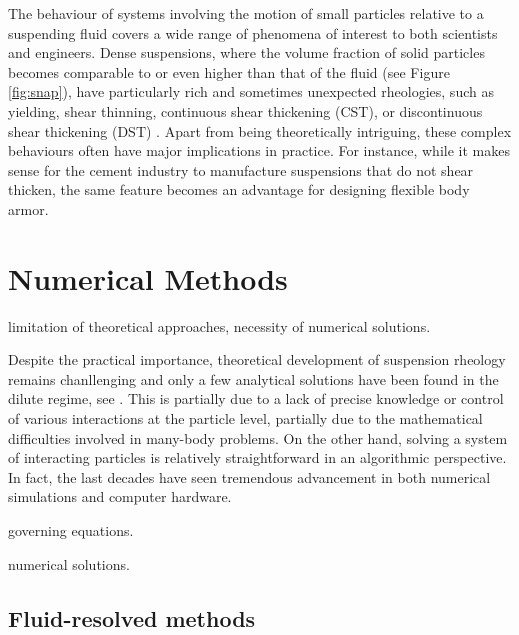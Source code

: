 The behaviour of systems involving the motion of small particles relative to a suspending fluid covers a wide range of phenomena of interest to both scientists and engineers. Dense suspensions, where the volume fraction of solid particles becomes comparable to or even higher than that of the fluid (see Figure \ref{fig:snap}), have particularly rich and sometimes unexpected rheologies, such as yielding, shear thinning, continuous shear thickening (CST), or discontinuous shear thickening (DST) \citep{mewis_wagner_book, Morton_Morris_2014, guazzelli_pouliquen_2018, Morris_annurev2020}. Apart from being theoretically intriguing, these complex behaviours often have major implications in practice. For instance, while it makes sense for the cement industry to manufacture suspensions that do not shear thicken, the same feature becomes an advantage for designing flexible body armor.



\chapter{Numerical Methods}



limitation of theoretical approaches,
necessity of numerical solutions.

Despite the practical importance, theoretical development of suspension rheology remains chanllenging and only a few analytical solutions have been found in the dilute regime, see \eg \cite{Einstein_1906, batchelor_green_1972b}. This is partially due to a lack of precise knowledge or control of various interactions at the particle level, partially due to the mathematical difficulties involved in many-body problems. On the other hand, solving a system of interacting particles is relatively straightforward in an algorithmic perspective. In fact, the last decades have seen tremendous advancement in both numerical simulations and computer hardware.

governing equations.

numerical solutions.



\section{Fluid-resolved methods}

